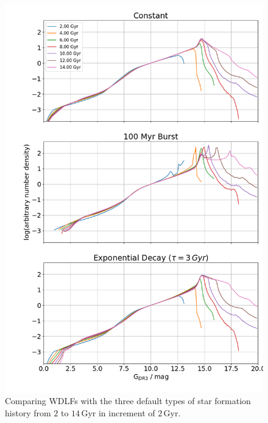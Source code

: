 \documentclass[fleqn,usenatbib]{rasti}
\begin{document}
\begin{figure}
    \centering
    \includegraphics[width=\columnwidth]{wdlf_compare_sfr.png}
    \caption{Comparing WDLFs with the three default types of star formation
    history from $2$ to $14\,$Gyr in increment of $2$\,Gyr.}
    \label{fig:compare_sfr_age_type}
\end{figure}
\end{document}
